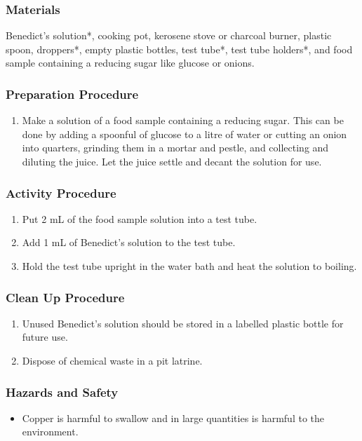 \subsubsection*{Materials}
Benedict's solution*, cooking pot, kerosene stove or charcoal burner, plastic spoon, droppers*, empty plastic bottles, test tube*, test tube holders*, and food sample containing a reducing sugar like glucose or onions.

\subsubsection*{Preparation Procedure}
\begin{enumerate}
\item{Make a solution of a food sample containing a reducing sugar. This can be done by adding a spoonful of glucose to a litre of water or cutting an onion into quarters, grinding them in a mortar and pestle, and collecting and diluting the juice. Let the juice settle and decant the solution for use.}
\end{enumerate}

\subsubsection*{Activity Procedure}
\begin{enumerate}
\item{Put 2 mL of the food sample solution into a test tube.}
\item{Add 1 mL of Benedict's solution to the test tube.}
\item{Hold the test tube upright in the water bath and heat the solution to boiling.}
\end{enumerate}

\subsubsection*{Clean Up Procedure}
\begin{enumerate}
\item{Unused Benedict's solution should be stored in a labelled plastic bottle for future use.}
\item{Dispose of chemical waste in a pit latrine.}
\end{enumerate}

\subsubsection*{Hazards and Safety}
\begin{itemize}
\item{Copper is harmful to swallow and in large quantities is harmful to the environment.}
\end{itemize}

